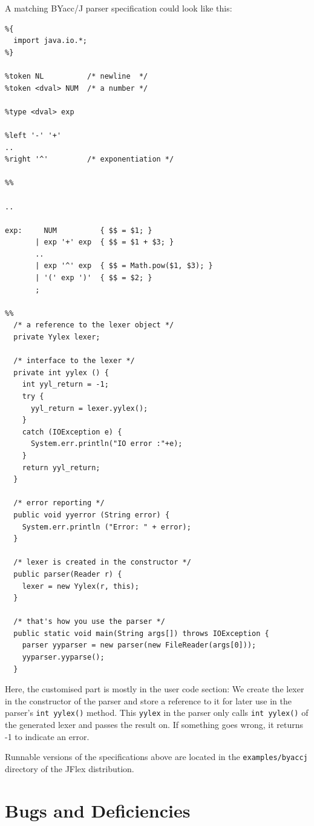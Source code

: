 \documentclass[11pt]{scrartcl}
\newcommand{\xsmall}{\small}
\begin{document}
A matching BYacc/J parser specification could look like this:
{\xsmall\begin{verbatim}
%{
  import java.io.*;
%}
      
%token NL          /* newline  */
%token <dval> NUM  /* a number */

%type <dval> exp

%left '-' '+'
..
%right '^'         /* exponentiation */
      
%%

..
      
exp:     NUM          { $$ = $1; }
       | exp '+' exp  { $$ = $1 + $3; }
       ..
       | exp '^' exp  { $$ = Math.pow($1, $3); }
       | '(' exp ')'  { $$ = $2; }
       ;

%%
  /* a reference to the lexer object */
  private Yylex lexer;

  /* interface to the lexer */
  private int yylex () {
    int yyl_return = -1;
    try {
      yyl_return = lexer.yylex();
    }
    catch (IOException e) {
      System.err.println("IO error :"+e);
    }
    return yyl_return;
  }

  /* error reporting */
  public void yyerror (String error) {
    System.err.println ("Error: " + error);
  }

  /* lexer is created in the constructor */
  public parser(Reader r) {
    lexer = new Yylex(r, this);
  }

  /* that's how you use the parser */
  public static void main(String args[]) throws IOException {
    parser yyparser = new parser(new FileReader(args[0]));
    yyparser.yyparse();    
  }
\end{verbatim}
}

Here, the customised part is mostly in the user code section:
We create the lexer in the constructor of the parser and store
a reference to it for later use in the parser's \texttt{int yylex()}
method. This \texttt{yylex} in the parser only calls \texttt{int yylex()}
of the generated lexer and passes the result on. If something goes
wrong, it returns -1 to indicate an error.

Runnable versions of the specifications above 
are located in the \texttt{examples/byaccj} directory of the JFlex 
distribution.



\section{Bugs and Deficiencies}\label{Bugs}
\end{document}
